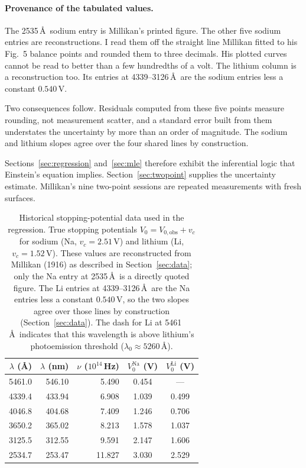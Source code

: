 \documentclass[12pt]{article}
\begin{document}
\paragraph{Provenance of the tabulated values.}
The 2535\,\AA\ sodium entry is Millikan's printed figure.  The other five
sodium entries are reconstructions.  I read them off the straight line
Millikan fitted to his Fig.~5 balance points and rounded them to three
decimals.  His plotted curves cannot be read to better than a few hundredths
of a volt.  The lithium column is a reconstruction too.  Its entries at
4339--3126\,\AA\ are the sodium entries less a constant $0.540$\,V.

Two consequences follow.  Residuals computed from these five points measure
rounding, not measurement scatter, and a standard error built from them
understates the uncertainty by more than an order of magnitude.  The sodium
and lithium slopes agree over the four shared lines by construction.

Sections~\ref{sec:regression} and~\ref{sec:mle} therefore exhibit the
inferential logic that Einstein's equation implies.
Section~\ref{sec:twopoint} supplies the uncertainty estimate.  Millikan's
nine two-point sessions are repeated measurements with fresh surfaces.

\begin{table}[ht]
\centering
\caption{Historical stopping-potential data used in the regression.
True stopping potentials $V_0 = V_{0,\text{obs}} + v_c$ for sodium
(Na, $v_c = 2.51$\,V) and lithium (Li, $v_c = 1.52$\,V).
These values are reconstructed from Millikan (1916) as described
in Section~\ref{sec:data}; only the Na entry at 2535\,\AA\ is a directly
quoted figure.  The Li entries at 4339--3126\,\AA\ are the Na entries less a
constant $0.540$\,V, so the two slopes agree over those lines by construction
(Section~\ref{sec:data}).
The dash for Li at 5461\,\AA\ indicates
that this wavelength is above lithium's photoemission threshold
($\lambda_0 \approx 5260$\,\AA).}
\label{tab:millikan_data}
\medskip
\begin{tabular}{rrrcc}
\toprule
$\lambda$ (\AA) & $\lambda$ (nm) & $\nu$ ($10^{14}$\,Hz)
  & $V_0^{\mathrm{Na}}$ (V)
  & $V_0^{\mathrm{Li}}$ (V) \\
\midrule
5461.0 & 546.10 &  5.490 & 0.454  & ---    \\
4339.4 & 433.94 &  6.908 & 1.039  & 0.499  \\
4046.8 & 404.68 &  7.409 & 1.246  & 0.706  \\
3650.2 & 365.02 &  8.213 & 1.578  & 1.037  \\
3125.5 & 312.55 &  9.591 & 2.147  & 1.606  \\
2534.7 & 253.47 & 11.827 & 3.030  & 2.529  \\
\bottomrule
\end{tabular}
\end{table}
\end{document}
